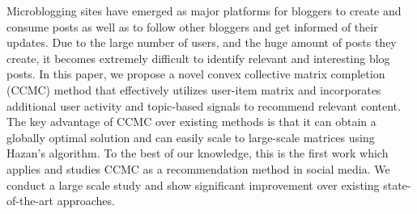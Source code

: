 Microblogging sites have emerged as major platforms for bloggers to create and consume posts as well as to follow other bloggers and get informed of their updates. Due to the large number of users, and the huge amount of posts they create, it becomes extremely difficult to identify relevant and interesting blog posts. In this paper, we propose a novel convex collective matrix completion (CCMC) method that effectively utilizes user-item matrix and incorporates additional user activity and topic-based signals to recommend relevant content. The key advantage of CCMC over existing methods is that it can obtain a globally optimal solution and can easily scale to large-scale matrices using Hazan's algorithm. To the best of our knowledge, this is the first work which applies and studies CCMC as a recommendation method in social media. We conduct a large scale study and show significant improvement over existing state-of-the-art approaches.
